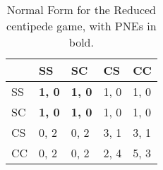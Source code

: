 \begin{table}[h!]
  \centering
  \begin{tabular}{|l|l|l|l|l|}
    \hline
           &   SS          &  SC           &  CS  &   CC \\ \hline
       SS  & \textbf{1, 0} & \textbf{1, 0} & 1, 0 & 1, 0 \\ \hline
       SC  & \textbf{1, 0} & \textbf{1, 0} & 1, 0 & 1, 0 \\ \hline
       CS  & 0, 2          & 0, 2          & 3, 1 & 3, 1 \\ \hline
       CC  & 0, 2          & 0, 2          & 2, 4 & 5, 3 \\ \hline
  \end{tabular}
  \caption{Normal Form for the Reduced centipede game, with PNEs in bold.}
  \label{lt1}
\end{table}



